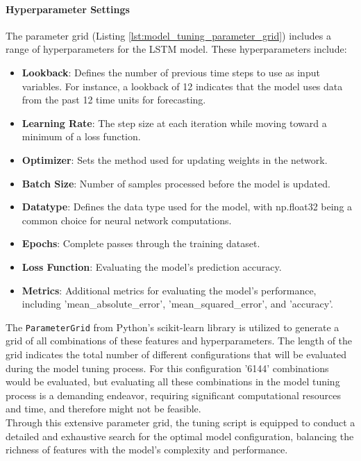\paragraph{Hyperparameter Settings}
The parameter grid (Listing \ref{lst:model_tuning_parameter_grid}) includes a range of hyperparameters for the LSTM model. These hyperparameters include:
\begin{itemize}
    \item \textbf{Lookback}: Defines the number of previous time steps to use as input variables. For instance, a lookback of 12 indicates that the model uses data from the past 12 time units for forecasting.
    \item \textbf{Learning Rate}: The step size at each iteration while moving toward a minimum of a loss function.
    \item \textbf{Optimizer}: Sets the method used for updating weights in the network.
    \item \textbf{Batch Size}: Number of samples processed before the model is updated.
    \item \textbf{Datatype}: Defines the data type used for the model, with np.float32 being a common choice for neural network computations.
    \item \textbf{Epochs}: Complete passes through the training dataset.
    \item \textbf{Loss Function}: Evaluating the model's prediction accuracy.
    \item \textbf{Metrics}: Additional metrics for evaluating the model's performance, including 'mean\_absolute\_error', 'mean\_squared\_error', and 'accuracy'.
\end{itemize}

The \texttt{ParameterGrid} from Python's scikit-learn library \cite{ScikitLearnParameterGrid} is utilized to generate a grid of all combinations of these features and hyperparameters. The length of the grid indicates the total number of different configurations that will be evaluated during the model tuning process.  For this configuration '6144' combinations would be evaluated, but evaluating all these combinations in the model tuning process is a demanding endeavor, requiring significant computational resources and time, and therefore might not be feasible. \\

Through this extensive parameter grid, the tuning script is equipped to conduct a detailed and exhaustive search for the optimal model configuration, balancing the richness of features with the model's complexity and performance.

